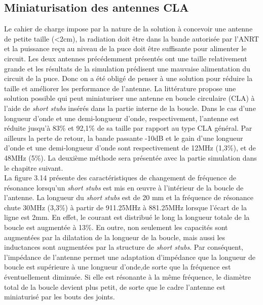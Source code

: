 \documentclass[11pt, a4paper, twoside]{book}
\begin{document}
\subsection{Miniaturisation des antennes CLA}
Le cahier de charge impose par la nature de la solution à concevoir une antenne de petite taille (<2cm), la radiation doit être dans la bande autorisée par l'ANRT et la puissance reçu au niveau de la puce doit être suffisante pour alimenter le circuit. Les deux antennes précédemment présentés ont une taille relativement grande et les résultats de la simulation prédisent une mauvaise alimentation du circuit de la puce. Donc on a été obligé de penser à une solution pour réduire la taille et améliorer les performance de l'antenne. La littérature \cite{stub}  propose une solution possible qui peut
miniaturiser une antenne en boucle circulaire (CLA) à l'aide de \emph{short stubs} insérés dans la partie interne de la boucle. Dans le cas d'une longueur d'onde et une demi-longueur d'onde, respectivement, l'antenne est réduite jusqu'à 83\% et 92,1\% de sa taille par rapport au type CLA général. Par ailleurs la perte de retour, la bande passante -10dB et le gain d'une longueur d'onde et une demi-longueur d'onde sont respectivement de 12MHz (1,3\%), et de 48MHz (5\%). La deuxième méthode sera présentée avec la partie simulation dans le chapitre suivant.\\

La figure 3.14 présente des caractéristiques de changement de fréquence de résonance lorsqu'un \emph{short stubs} est mis en œuvre à l'intérieur de la boucle de l'antenne. La longueur du  \emph{short stubs} est de 20 mm et la fréquence de résonance chute 30MHz (3,3\%) à partir de 911.25MHz à 881.25MHz lorsque l'écart de la ligne est 2mm. En effet, le courant est distribué le long la longueur totale de la boucle est augmentée à 13\%. En outre, non seulement les capacités sont augmentées par la dilatation de la longueur de la boucle, mais aussi les inductances sont augmentées par la structure de \emph{short stubs}. Par conséquent, l'impédance de l'antenne permet une adaptation d'impédance que la longueur de boucle est supérieure à une longueur d'onde,de sorte que la fréquence est éventuellement diminuée. Si elle est résonante à la même fréquence, le diamètre total de la boucle devient plus petit, de sorte que le cadre l'antenne est miniaturisé par les bouts des joints.
\end{document}
